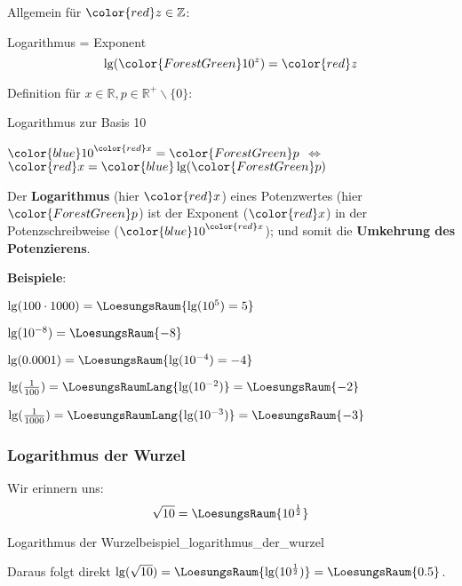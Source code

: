 \vspace{5mm}

Allgemein für ${\color{red}z}\in \mathbb{Z}$:

\begin{gesetz}{Logarithmus = Exponent}{}
  $$\lg({\color{ForestGreen} 10^z}) = {\color{red} z}$$
\end{gesetz}


Definition für $x\in\mathbb{R}, p \in \mathbb{R}^{+}\backslash\{0\}$:
\begin{definition}{Logarithmus zur Basis 10}{}
  \begin{center}
    ${\color{blue}10}^{\color{red}x}={\color{ForestGreen}p}$
    $\Longleftrightarrow$
    ${\color{red}x} = {\color{blue}\lg}({\color{ForestGreen}p})$
    \end{center}
\end{definition}

\begin{bemerkung}{}{}
  Der \textbf{Logarithmus} (hier $\color{red}x$) eines Potenzwertes
  (hier $\color{ForestGreen}p$) ist der Exponent ($\color{red}x$) in der
  Potenzschreibweise (${\color{blue}10}^{\color{red}x}$); und somit die \textbf{Umkehrung des Potenzierens}.
\end{bemerkung}

\textbf{Beispiele}:\\
\leserluft{}

$\lg(100 \cdot{} 1000) = \LoesungsRaum{\lg(10^5)=5}$
\leserluft{}

$\lg(10^{-8}) = \LoesungsRaum{-8}$
\leserluft{}

$\lg(0.0001) = \LoesungsRaum{\lg(10^{-4})=-4}$

$\lg(\frac1{100}) =\LoesungsRaumLang{\lg(10^{-2}) } = \LoesungsRaum{-2}$
\leserluft{}

$\lg(\frac1{1000}) =\LoesungsRaumLang{\lg(10^{-3}) } = \LoesungsRaum{-3}$

\newpage
\subsubsection{Logarithmus der Wurzel}
Wir erinnern uns: $$\sqrt{10} =\LoesungsRaum{ 10^\frac12}$$
\begin{beispiel}{Logarithmus der
    Wurzel}{beispiel_logarithmus_der_wurzel}

  Daraus folgt direkt $\lg(\sqrt{10}) = \LoesungsRaum{\lg(10^\frac12)}  = \LoesungsRaum{0.5}$.
\end{beispiel}

